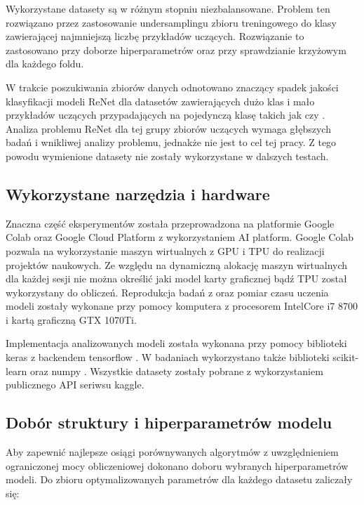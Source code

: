 \documentclass[oneside, mag]{mgr}
\begin{document}
Wykorzystane datasety są w różnym stopniu niezbalansowane. Problem ten rozwiązano przez zastosowanie undersamplingu zbioru treningowego do klasy zawierającej najmniejszą liczbę przykładów uczących. Rozwiązanie to zastosowano przy doborze hiperparametrów oraz przy sprawdzianie krzyżowym dla każdego foldu.

W trakcie poszukiwania zbiorów danych odnotowano znaczący spadek jakości klasyfikacji modeli ReNet dla datasetów zawierających dużo klas i mało przykładów uczących przypadających na pojedynczą klasę takich jak \cite{fruits-dataset} czy \cite{face-dataset}. Analiza problemu ReNet dla tej grupy zbiorów uczących wymaga głębszych badań i wnikliwej analizy problemu, jednakże nie jest to cel tej pracy. Z tego powodu wymienione datasety nie zostały wykorzystane w dalszych testach. 

\subsection{Wykorzystane narzędzia i hardware}

Znaczna część eksperymentów została przeprowadzona na platformie Google Colab oraz Google Cloud Platform z wykorzystaniem AI platform. Google Colab pozwala na wykorzystanie maszyn wirtualnych z GPU i TPU do realizacji projektów naukowych. Ze względu na dynamiczną alokację maszyn wirtualnych dla każdej sesji nie można określić jaki model karty graficznej bądź TPU został wykorzystany do obliczeń. Reprodukcja badań z \cite{DBLP:journals/corr/VisinKCMCB15} oraz pomiar czasu uczenia modeli zostały wykonane przy pomocy komputera z procesorem IntelCore i7 8700 i kartą graficzną GTX 1070Ti.

Implementacja analizowanych modeli została wykonana przy pomocy biblioteki keras \cite{keras} z backendem tensorflow \cite{tensorflow}. W badaniach wykorzystano także biblioteki scikit-learn \cite{scikit-learn} oraz numpy \cite{numpy}. Wszystkie datasety zostały pobrane z wykorzystaniem publicznego API seriwsu kaggle.

\subsection{Dobór struktury i hiperparametrów modelu}

Aby zapewnić najlepsze osiągi porównywanych algorytmów z uwzględnieniem ograniczonej mocy obliczeniowej dokonano doboru wybranych hiperparametrów modeli. Do zbioru optymalizowanych parametrów dla każdego datasetu zaliczały się:
\end{document}
